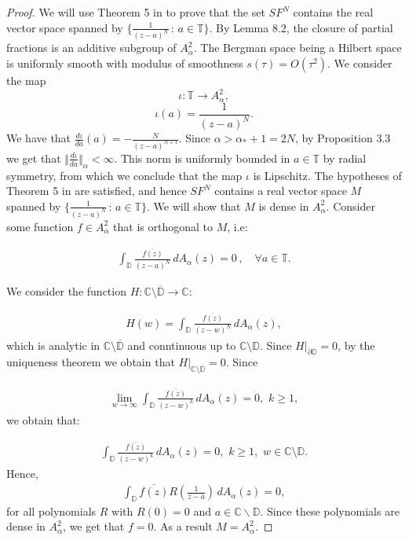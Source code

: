 \documentclass{amsart}[11pt]
\newcommand{\C}{\mathbb{C}} %
\newcommand{\D}{\mathbb{D}} %
\newcommand{\T}{\mathbb{T}} %
\newcommand{\no}[1]{\Vert #1 \Vert} %
\newcommand{\ra}{\rightarrow}
\theoremstyle{definition}
\begin{document}
\begin{proof}
We will use Theorem 5 in \cite{Borodin2014} to prove that the set $SF^N$ contains the real vector space spanned by $\bigg\{ \frac{1}{(z-a)^N} \, : \, a \in \T \bigg\}$. By Lemma 8.2, the closure of partial fractions is an additive subgroup of $A^2_{\alpha}$. The Bergman space being a Hilbert space is uniformly smooth with modulus of smoothness $s(\tau) = O(\tau^2)$. We consider the map $$\iota : \T \ra A^2_{\alpha},$$ $$\iota(a) =  \frac{1}{(z-a)^N}.$$ We have that $\frac{d \iota}{d a} (a) = -\frac{N}{(z-a)^{N+1}}$. Since $\alpha > \alpha_{\ast} + 1 = 2N$, by Proposition 3.3 we get that $\no{\frac{d \iota}{d a}}_{\alpha} <  \infty$. This norm is uniformly bounded in $a \in \T$ by radial symmetry, from which we conclude that the map $\iota$ is Lipschitz. The hypotheses of Theorem 5 in \cite{Borodin2014} are satisfied, and hence $SF^N$ contains a real vector space $M$ spanned by $\bigg\{ \frac{1}{(z-a)^N} \, : \, a \in \T \bigg\}$. We will show that $M$ is dense in $A^2_{\alpha}$. Consider some function $f \in A^2_{\alpha}$ that is orthogonal to $M$, i.e:

\begin{gather}
    \int_{\D} \frac{\overline{f(z)}}{(z-a)^N} \,dA_{\alpha}(z) = 0 \, ,\quad \forall a \in \T.
\end{gather}

We consider the function $H: \C \setminus \overline{\D}  \ra \C$:

\begin{gather*}
H(w) = \int_{\D} \frac{\overline{f(z)}}{(z-w)^N} \,dA_{\alpha}(z),
\end{gather*}
which is analytic in $\C \setminus \overline{\D}$ and conntinuous up to $\C \setminus \D$. Since $H \big\vert_{\partial \D} = 0$, by the uniqueness theorem we obtain that $H \big\vert_{\C \setminus \overline{\D}} = 0$. Since 

\begin{gather*}
\lim_{w \ra \infty} \int_{\D} \frac{\overline{f(z)}}{(z-w)^k} \,dA_{\alpha}(z) = 0, \,\, k \geq 1,
\end{gather*}
we obtain that:

\begin{gather*}
\int_{\D} \frac{\overline{f(z)}}{(z-w)^k} \,dA_{\alpha}(z) = 0, \,\, k \geq 1 , \,\, w \in \C \setminus \D.
\end{gather*}
Hence,
\begin{gather*}
     \int_{\D} \overline{f(z)} R(\frac{1}{z-a}) \,dA_{\alpha}(z) = 0, 
\end{gather*}
for all polynomials $R$ with $R(0)=0$ and $a \in \C \backslash \D$. Since these polynomials are dense in $A^2_{\alpha}$, we get that $f = 0$. As a result $M = A^2_{\alpha}$.
\end{proof}
\end{document}
